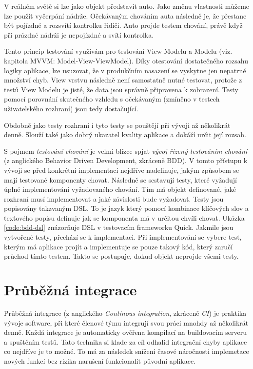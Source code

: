 V reálném světě si lze jako objekt představit auto.
Jako změnu vlastnosti můžeme lze použít vyčerpání nádrže.
Očekávaným chováním auta následně je, že přestane být pojízdné a rozsvítí kontrolku řidiči.
Auto projde testem chování, právě když při prázdné nádrži je nepojízdné a svítí kontrolka.

Tento princip testování využívám pro testování View Modelu a Modelu (viz. kapitola MVVM: Model-View-ViewModel).
Díky otestování dostatečného rozsahu logiky aplikace, lze usuzovat, že v produkčním nasazení se vyskytne jen nepatrné množství chyb.
View vrstvu následně není samostatně nutné testovat, protože z testů View Modelu je jisté, že data jsou správně připravena k zobrazení.
Testy pomocí porovnání skutečného vzhledu s očekávaným (zmíněno v testech uživatelského rozhraní) jsou tedy dostačující.

Obdobně jako testy rozhraní i tyto testy se pouštějí při vývoji až několikrát denně.
Slouží také jako dobrý ukazatel kvality aplikace a dokáží určit její rozsah.

S pojmem \textit{testování chování} je velmi blízce spjat \textit{vývoj řízený testováním chování} (z anglického Behavior Driven Development, zkráceně BDD).
V tomto přístupu k vývoji se před konkrétní implementací nejdříve nadefinuje, jakým způsobem se mají testované komponenty chovat.
Následně se sestavují testy, které vyžadují úplné implementování vyžadovaného chování.
Tím má objekt definované, jaké rozhraní musí implementovat a jaké závislosti bude vyžadovat.
Testy jsou popisovány takzvaným DSL.
To je jazyk který pomocí kombinace klíčových slov a textového popisu definuje jak se komponenta má v určitou chvíli chovat.
Ukázka \ref{code:bdd-dsl} znázorňuje DSL v testovacím frameworku Quick.
Jakmile jsou vytvořené testy, přechází se k implementaci.
Při implementování se vybere test, kterým má aplikace projít a implementuje se pouze takový kód, který zaručí průchod tímto testem.
Takto se postupuje, dokud objekt neprojde všemi testy. \cite{objcio-bdd}


\section{Průběžná integrace}

Průběžná integrace (z anglického \textit{Continous integration}, zkráceně \textit{CI}) je praktika vývoje software, při které členové týmu integrují svou práci mnohdy až několikrát denně.
Každá integrace je automaticky ověřena kompilací na buildovacím serveru a spuštěním testů.
Tato technika si klade za cíl odhalid integrační chyby aplikace co nejdříve je to možné.
To má za následek snížení časové náročnosti implemetace nových funkcí bez rizika narušení funkcionalit původní aplikace.

